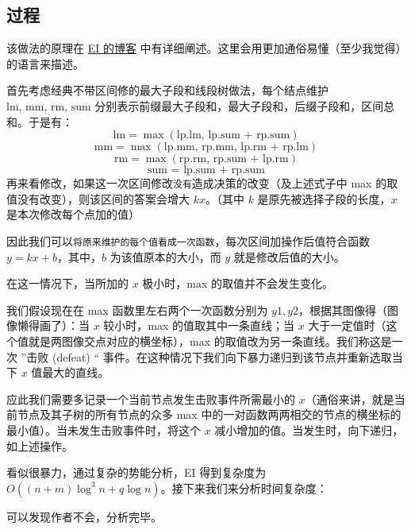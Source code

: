 \documentclass[10pt,twoside,a4paper,UTF8]{ctexbook}
\begin{document}
	\subsection{过程}
	该做法的原理在 \href{https://blog.csdn.net/EI_Captain/article/details/101040226}{EI 的博客} 中有详细阐述。这里会用更加通俗易懂（至少我觉得）的语言来描述。\par
	首先考虑经典不带区间修的最大子段和线段树做法，每个结点维护 $\text{lm, mm, rm, sum}$ 分别表示前缀最大子段和，最大子段和，后缀子段和，区间总和。于是有：
	$$\text{lm} = \max(\text{lp.lm, lp.sum + rp.sum})$$
	$$\text{mm} = \max(\text{lp.mm, rp.mm, lp.rm + rp.lm})$$
	$$\text{rm} = \max(\text{rp.rm, rp.sum + lp.rm})$$
	$$\text{sum = lp.sum + rp.sum}$$
	再来看修改，如果这一次区间修改\texttt{没有}造成决策的改变（及上述式子中 max 的取值没有改变），则该区间的答案会增大 $kx$。（其中 $k$ 是原先被选择子段的长度，$x$ 是本次修改每个点加的值）\par
	因此我们可以\texttt{将原来维护的每个值看成一次函数}，每次区间加操作后值符合函数 $y=kx+b$，其中，$b$ 为该值原本的大小，而 $y$ 就是修改后值的大小。\par
	在这一情况下，当所加的 $x$ 极小时，max 的取值并不会发生变化。\par
	我们假设现在在 max 函数里左右两个一次函数分别为 $y1, y2$，根据其图像得（图像懒得画了）：当 $x$ 较小时，max 的值取其中一条直线；当 $x$ 大于一定值时（这个值就是两图像交点对应的横坐标），max 的取值改为另一条直线。我们称这是一次 ”击败 (defeat) “ 事件。在这种情况下我们向下暴力递归到该节点并重新选取当下 $x$ 值最大的直线。\par
	应此我们需要多记录一个当前节点发生击败事件所需最小的 $x$（通俗来讲，就是当前节点及其子树的所有节点的众多 max 中的一对函数两两相交的节点的横坐标的最小值）。当未发生击败事件时，将这个 $x$ 减小增加的值。当发生时，向下递归，如上述操作。\par 
	看似很暴力，通过复杂的势能分析，EI 得到复杂度为 $O((n+m)\log^3n+q\log n)$。接下来我们来分析时间复杂度：\par
	可以发现作者不会，分析完毕。\par
\end{document}

